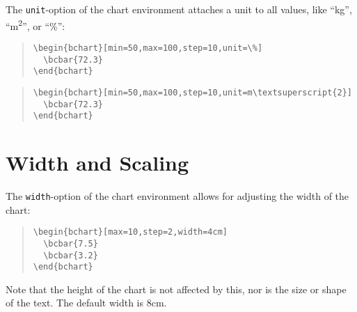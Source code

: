 \documentclass{article}
\begin{document}
The \texttt{unit}-option of the chart environment attaches a unit to all values, like ``kg'', ``m\textsuperscript{2}'', or ``\%'':
\begin{quote}\small
\begin{verbatim}
\begin{bchart}[min=50,max=100,step=10,unit=\%]
  \bcbar{72.3}
\end{bchart}
\end{verbatim}
\end{quote}
\begin{quote}
\begin{bchart}[min=50,max=100,step=10,unit=\%]
\end{bchart}
\end{quote}
\begin{quote}\small
\begin{verbatim}
\begin{bchart}[min=50,max=100,step=10,unit=m\textsuperscript{2}]
  \bcbar{72.3}
\end{bchart}
\end{verbatim}
\end{quote}
\begin{quote}
\begin{bchart}[min=50,max=100,step=10,unit=m\textsuperscript{2}]
\end{bchart}
\end{quote}


\section{Width and Scaling}

The \texttt{width}-option of the chart environment allows for adjusting the width of the chart:
\begin{quote}\small
\begin{verbatim}
\begin{bchart}[max=10,step=2,width=4cm]
  \bcbar{7.5}
  \bcbar{3.2}
\end{bchart}
\end{verbatim}
\end{quote}
\begin{quote}
\begin{bchart}[max=10,step=2,width=4cm]
\end{bchart}
\end{quote}
Note that the height of the chart is not affected by this, nor is the size or shape of the text. The default width is 8cm.
\end{document}
